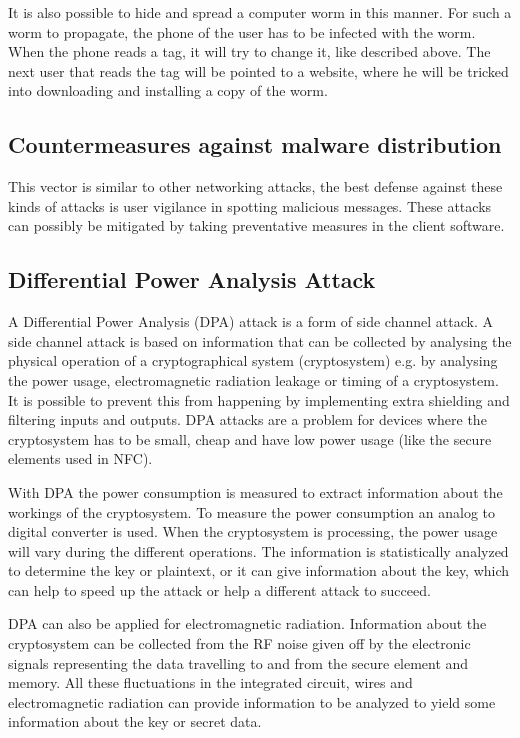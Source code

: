 It is also possible to hide and spread a computer worm in this manner.
For such a worm to propagate, the phone of the user has to be infected with the worm. When the phone reads a tag, it will try to change it, like described above. The next user that reads the tag will be pointed to a website, where he will be tricked into downloading and installing a copy of the worm.

\cite{mulliner2009vulnerability,rieback2006your} %

\subsection{Countermeasures against malware distribution}
This vector is similar to other networking attacks, the best defense against these kinds of attacks is user vigilance in spotting malicious messages.
These attacks can possibly be mitigated by taking preventative measures in the client software.

\subsection{Differential Power Analysis Attack}
A Differential Power Analysis (DPA) attack is a form of side channel attack.
A side channel attack is based on information that can be collected by analysing the physical operation of a cryptographical system (cryptosystem) e.g. by analysing the power usage, electromagnetic radiation leakage or timing of a cryptosystem.
It is possible to prevent this from happening by implementing extra shielding and filtering inputs and outputs.
DPA attacks are a problem for devices where the cryptosystem has to be small, cheap and have low power usage (like the secure elements used in NFC).

With DPA the power consumption is measured to extract information about the workings of the cryptosystem.
To measure the power consumption an analog to digital converter is used.
When the cryptosystem is processing, the power usage will vary during the different operations.
The information is statistically analyzed to determine the key or plaintext, or it can give information about the key, which can help to speed up the attack or help a different attack to succeed. %

DPA can also be applied for electromagnetic radiation. %
Information about the cryptosystem can be collected from the RF noise given off by the electronic signals representing the data travelling to and from the secure element and memory.
All these fluctuations in the integrated circuit, wires and electromagnetic radiation can provide information to be analyzed to yield some information about the key or secret data.

